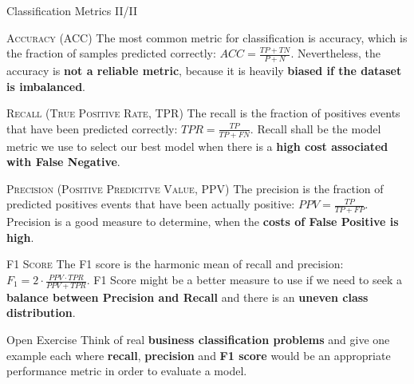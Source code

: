 \documentclass[main.tex]{subfiles}
\begin{document}
    \begin{frame}{Classification Metrics II/II}
        \begin{alertblock}{\textsc{Accuracy (ACC)}}
        The most common metric for classification is accuracy, which is the fraction of samples predicted correctly: $ACC = \frac{TP + TN}{P + N}$. Nevertheless, the accuracy is \textbf{not a reliable metric}, because it is heavily \textbf{biased if the dataset is imbalanced}.
        \end{alertblock}
        
        \begin{alertblock}{\textsc{Recall (True Positive Rate, TPR)}}
        The recall is the fraction of positives events that have been predicted correctly: $TPR = \frac{TP}{TP + FN}$. Recall shall be the model metric we use to select our best model when there is a \textbf{high cost associated with False Negative}.
        \end{alertblock}
        
        \begin{alertblock}{\textsc{Precision (Positive Predicitve Value, PPV)}}
        The precision is the fraction of predicted positives events that have been actually positive: $PPV = \frac{TP}{TP + FP}$. Precision is a good measure to determine, when the \textbf{costs of False Positive is high}.
        \end{alertblock}
        
        \begin{alertblock}{\textsc{F1 Score}}
        The F1 score is the harmonic mean of recall and precision: $F_1 = 2 \cdot \frac{PPV \cdot TPR}{PPV + TPR}$. F1 Score might be a better measure to use if we need to seek a \textbf{balance between Precision and Recall} and there is an \textbf{uneven class distribution}.
        \end{alertblock}
    \end{frame}

    \begin{frame}{Open Exercise }
        Think of real \textbf{business classification problems} and give one example each where \textbf{recall}, \textbf{precision} and \textbf{F1 score} would be an appropriate performance metric in order to evaluate a model.
    \end{frame}

\end{document}
